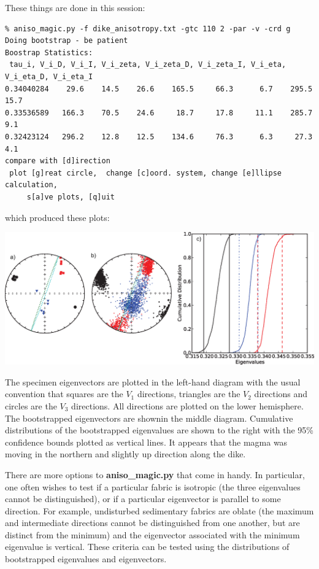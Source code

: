 \documentclass[11pt]{book}
\begin{document}
{{These things  are done in this session: 

\begin{verbatim}
% aniso_magic.py -f dike_anisotropy.txt -gtc 110 2 -par -v -crd g
Doing bootstrap - be patient
Boostrap Statistics: 
 tau_i, V_i_D, V_i_I, V_i_zeta, V_i_zeta_D, V_i_zeta_I, V_i_eta, V_i_eta_D, V_i_eta_I
0.34040284    29.6    14.5    26.6    165.5     66.3      6.7    295.5     15.7 
0.33536589   166.3    70.5    24.6     18.7     17.8     11.1    285.7      9.1 
0.32423124   296.2    12.8    12.5    134.6     76.3      6.3     27.3      4.1 
compare with [d]irection 
 plot [g]reat circle,  change [c]oord. system, change [e]llipse calculation,  
     s[a]ve plots, [q]uit 

\end{verbatim}

{\noindent which produced these plots:}


  \includegraphics[width=15cm]{EPSfiles/dike.eps}

The specimen eigenvectors are plotted in the left-hand diagram with the usual convention that squares are the $V_1$ directions, triangles are the $V_2$ directions and circles are the $V_3$ directions.  All directions are plotted on the lower hemisphere.     The bootstrapped eigenvectors are shownin the middle diagram.   Cumulative distributions of the bootstrapped eigenvalues are shown to the right with the 95\% confidence bounds plotted as vertical lines.  
It appears that the magma was moving in the northern and slightly up direction along the dike.  

There are more options to {\bf aniso\_magic.py} that come in handy.   In particular, one often wishes to test if a particular fabric is isotropic (the three eigenvalues cannot be distinguished), or if a particular eigenvector is parallel to some direction. For example, undisturbed sedimentary fabrics are oblate (the maximum and intermediate directions cannot be distinguished from one another, but are distinct from the minimum) and the eigenvector associated with the minimum eigenvalue is vertical. These criteria can be tested using the distributions of bootstrapped eigenvalues and eigenvectors.   

}}
\end{document}
